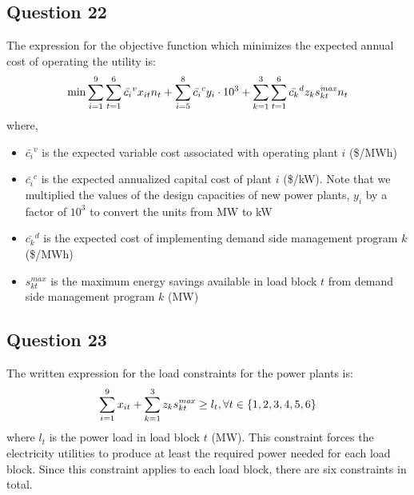 \documentclass[11pt,a4paper]{article}
\begin{document}
\subsection*{Question 22}
The expression for the objective function which minimizes the expected annual cost of operating the utility is:
\begin{align*}
	\min \sum_{i=1}^{9}\sum_{t=1}^{6} \bar{c_{i}}^{v}x_{it}n_{t} + \sum_{i=5}^{8}\bar{c_{i}}^{c}y_{i}\cdot 10^3 + \sum_{k=1}^{3}\sum_{t=1}^{6}\bar{c_{k}}^{d}z_{k}s_{kt} ^{\text{\textit{max}}}n_{t}
\end{align*}
where,
\begin{itemize}
	\item $\bar{c_{i}}^{v}$ is the expected variable cost associated with operating plant $i$ (\$/MWh)
	\item $\bar{c_{i}}^{c}$	is the expected annualized capital cost of  plant $i$ (\$/kW). Note that we multiplied the values of the design capacities of new power plants, $y_i$ by a factor of $10^3$ to convert the units from MW to kW
	\item $\bar{c_{k}}^{d}$ is the expected cost of implementing demand side management program $k$ (\$/MWh)
	\item $s_{kt} ^{max}$ is the maximum energy savings available in load block $t$ from demand side management program $k$ (MW)
\end{itemize}

\subsection*{Question 23}
The written expression for the load constraints for the power plants is:
\begin{align*}
	\sum_{i=1}^{9}x_{it} + \sum_{k=1}^{3}z_{k}s_{kt}^{\text{\textit{max}}}\geq l_{t},   \forall t\in{}\{1,2,3,4,5,6\}\\
\end{align*}
where $l_{t}$ is the power load in load block $t$ (MW). This constraint forces the electricity utilities to produce at least the required power needed for each load block. Since this constraint applies to each load block, there are six constraints in total.
\end{document}
